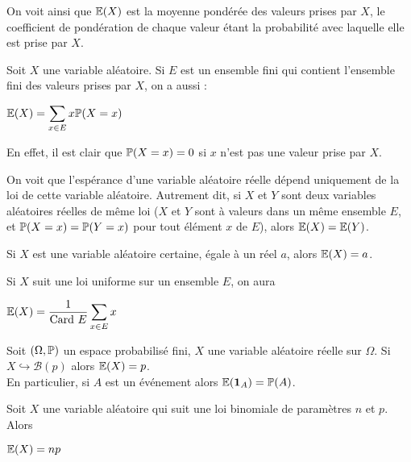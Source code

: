\documentclass[12pt,a4paper]{report}
\begin{document}
On voit ainsi que $\mathbb{E}(X)$ est la moyenne pondérée des valeurs prises par $X$, le coefficient de pondération de chaque valeur étant la probabilité avec laquelle elle est prise par $X$. 
\begin{remarque}{}
Soit $X$ une variable aléatoire. Si $E$ est un ensemble fini qui contient l'ensemble fini des valeurs prises par $X$, on a aussi :
\begin{center}
$\mathbb{E}(X) = \displaystyle \sum_{x \in E} x \mathbb{P}(X=x)$
\end{center}
En effet, il est clair que $\mathbb{P}(X=x) = 0$ si $x$ n'est pas une valeur prise par $X$.
\end{remarque}

\begin{remarque}{}
On voit que l'espérance d'une variable aléatoire réelle dépend uniquement de la loi de cette variable aléatoire. Autrement dit, si $X$ et $Y$ sont deux variables aléatoires réelles de même loi ($X$ et $Y$ sont à valeurs dans un même ensemble $E$, et $\mathbb{P}(X=x) = \mathbb{P}(Y=x)$ pour tout élément $x$ de $E$), alors $\mathbb{E}(X) = \mathbb{E}(Y)$.
\end{remarque}

\begin{exemple}{}
Si $X$ est une variable aléatoire certaine, égale à un réel $a$, alors $\mathbb{E}(X) = a$.
\end{exemple}

\begin{exemple}{}
Si $X$ suit une loi uniforme sur un ensemble $E$, on aura 
\begin{center}
$\mathbb{E}(X) = \dfrac{1}{\text{Card } E} \displaystyle \sum_{x \in E} x$
\end{center}
\end{exemple}

\begin{exemple}{}
Soit $(\Omega, \mathbb{P})$ un espace probabilisé fini, $X$ une variable aléatoire réelle sur $\Omega$. Si $X \hookrightarrow \mathcal{B}(p)$ alors $\mathbb{E}(X) = p$. \\

En particulier, si $A$ est un événement alors $\mathbb{E}(\textbf{1}_A) = \mathbb{P}(A)$.
\end{exemple}

\begin{exemple}[Exercice 10]{}
Soit $X$ une variable aléatoire qui suit une loi binomiale de paramètres $n$ et $p$. Alors 
\begin{center}
$\mathbb{E}(X) = np$
\end{center}
\end{exemple}
\end{document}
